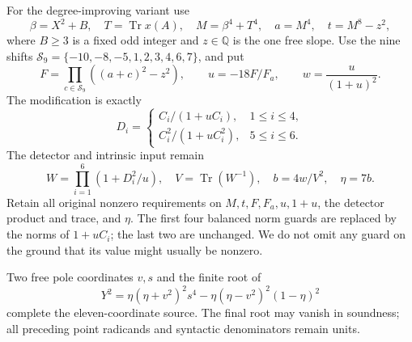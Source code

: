 \documentclass[11pt,a4paper]{article}
\newcommand{\Q}{\mathbb Q}\newcommand{\Z}{\mathbb Z}
\DeclareMathOperator{\Tr}{Tr}
\begin{document}
For the degree-improving variant use
\begin{equation}\label{eq:height}
 \beta=X^2+B,\quad T=\Tr x(A),\quad M=\beta^4+T^4,
 \quad a=M^4,\quad t=M^8-z^2,
\end{equation}
where $B\ge3$ is a fixed odd integer and $z\in\Q$ is the one free
slope. Use the nine shifts
$\mathcal S_9=\{-10,-8,-5,1,2,3,4,6,7\}$, and put
\[
 F=\prod_{c\in\mathcal S_9}((a+c)^2-z^2),\qquad
 u=-18F/F_a,\qquad w=\frac{u}{(1+u)^2}.
\]
The modification is exactly
\begin{equation}\label{eq:newD}
 D_i=\begin{cases}
 C_i/(1+uC_i),&1\le i\le4,\\
 C_i^2/(1+uC_i^2),&5\le i\le6.
 \end{cases}
\end{equation}
The detector and intrinsic input remain
\begin{equation}\label{eq:detector}
 W=\prod_{i=1}^6(1+D_i^2/u),\quad V=\Tr(W^{-1}),\quad
 b=4w/V^2,\quad\eta=7b.
\end{equation}
Retain all original nonzero requirements on $M,t,F,F_a,u,1+u$,
the detector product and trace, and $\eta$. The first four balanced
norm guards are replaced by the norms of $1+uC_i$; the last two are
unchanged. We do not omit any guard on the ground that its value might
usually be nonzero.

Two free pole coordinates $v,s$ and the finite root of
\begin{equation}\label{eq:pole}
 Y^2=\eta(\eta+v^2)^2s^4-\eta(\eta-v^2)^2(1-\eta)^2
\end{equation}
complete the eleven-coordinate source. The final root may vanish in
soundness; all preceding point radicands and syntactic denominators
remain units.
\end{document}
